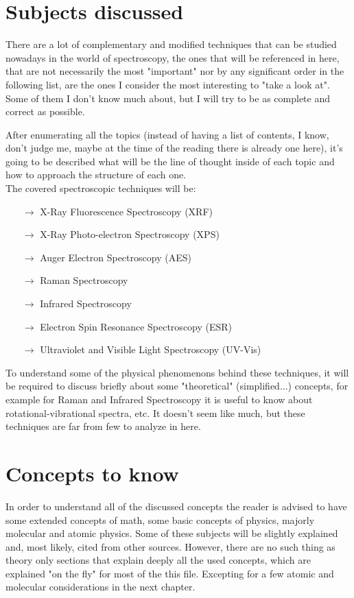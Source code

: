 \documentclass[]{report}
\begin{document}
\section{Subjects discussed}
\par There are a lot of complementary and modified techniques that can be studied nowadays in the world of spectroscopy, the ones that will be referenced in here, that are not necessarily the most "important" nor by any significant order in the following list, are the ones I consider the most interesting to "take a look at". Some of them I don't know much about, but I will try to be as complete and correct as possible.
\par After enumerating all the topics (instead of having a list of contents, I know, don't judge me, maybe at the time of the reading there is already one here), it's going to be described what will be the line of thought inside of each topic and how to approach the structure of each one.\\

The covered spectroscopic techniques will be:

\begin{itemize}
\item[$\to$] X-Ray Fluorescence Spectroscopy (XRF)
\item[$\to$] X-Ray Photo-electron Spectroscopy (XPS)
\item[$\to$] Auger Electron Spectroscopy (AES)
\item[$\to$] Raman Spectroscopy
\item[$\to$] Infrared Spectroscopy
\item[$\to$] Electron Spin Resonance Spectroscopy (ESR)
\item[$\to$] Ultraviolet and Visible Light Spectroscopy (UV-Vis)
\end{itemize}

\par To understand some of the physical phenomenons behind these techniques, it will be required to discuss briefly about some "theoretical" (simplified...) concepts, for example for Raman and Infrared Spectroscopy it is useful to know about rotational-vibrational spectra, etc. It doesn't seem like much, but these techniques are far from few to analyze in here.

\section{Concepts to know}
\par In order to understand all of the discussed concepts the reader is advised to have some extended concepts of math, some basic concepts of physics, majorly molecular and atomic physics. Some of these subjects will be slightly explained and, most likely, cited from other sources. However, there are no such thing as theory only sections that explain deeply all the used concepts, which are explained "on the fly" for most of the this file. Excepting for a few atomic and molecular considerations in the next chapter. 
\end{document}
